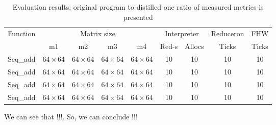 \begin{table}[ht]
    \centering    
    \begin{tabular}{|c|c|c|c|c|c|c|c|c|}
        \hline
        \multirow{2}{*}{Function} &  \multicolumn{4}{c|}{Matrix size}  & \multicolumn{2}{c|}{Interpreter}             & Reduceron & FHW \\
        \cline{2-7}
                                  &   m1 & m2 & m3 & m4                & Red-s & Allocs                               & Ticks     & Ticks\\
        \hline
        \hline
        Seq\_add & $64 \times 64$ & $64 \times 64$ & $64 \times 64$ & $64 \times 64$ & 10          & 10        & 10 & 10 \\ 
        Seq\_add & $64 \times 64$ & $64 \times 64$ & $64 \times 64$ & $64 \times 64$ & 10          & 10        & 10 & 10 \\ 
        Seq\_add & $64 \times 64$ & $64 \times 64$ & $64 \times 64$ & $64 \times 64$ & 10          & 10        & 10 & 10 \\ 
        Seq\_add & $64 \times 64$ & $64 \times 64$ & $64 \times 64$ & $64 \times 64$ & 10          & 10        & 10 & 10 \\ 
        \hline
        
    \end{tabular}
    \caption{Evaluation results: original program to distilled one ratio of measured metrics is presented}
    \label{tbl:evaluationResults}
\end{table}

We can see that !!!.
So, we can conclude !!!